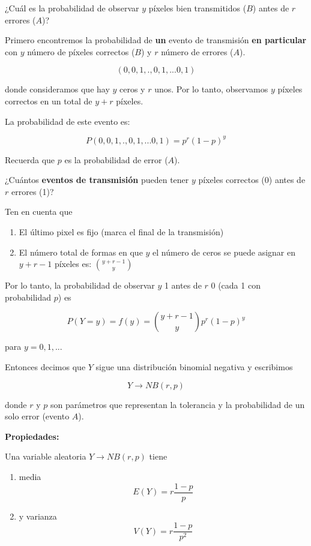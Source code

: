 \documentclass[
]{book}
\begin{document}
¿Cuál es la probabilidad de observar \(y\) píxeles bien transmitidos (\(B\)) antes de \(r\) errores (\(A\))?

Primero encontremos la probabilidad de \textbf{un} evento de transmisión \textbf{en particular} con \(y\) número de píxeles correctos (\(B\)) y \(r\) número de errores (\(A\)).

\[(0,0,1,., 0,1,...0,1)\]

donde consideramos que hay \(y\) ceros y \(r\) unos. Por lo tanto, observamos \(y\) píxeles correctos en un total de \(y + r\) píxeles.

La probabilidad de este evento es:

\[P(0,0,1,., 0,1,...0,1)=p^r(1-p)^y\]

Recuerda que \(p\) es la probabilidad de error (\(A\)).

¿Cuántos \textbf{eventos de transmisión} pueden tener \(y\) píxeles correctos (0) antes de \(r\) errores (1)?

Ten en cuenta que

\begin{enumerate}
\def\labelenumi{\arabic{enumi})}
\item
  El último pixel es fijo (marca el final de la transmisión)
\item
  El número total de formas en que \(y\) el número de ceros se puede asignar en \(y + r-1\) píxeles es: \(\binom {y + r-1} y\)
\end{enumerate}

Por lo tanto, la probabilidad de observar \(y\) 1 antes de \(r\) 0 (cada 1 con probabilidad \(p\)) es

\[P(Y=y)=f(y)=\binom {y+r-1} yp^r(1-p)^y\]

para \(y=0,1,...\)

Entonces decimos que \(Y\) sigue una distribución binomial negativa y escribimos

\[Y\rightarrow NB(r,p)\]

donde \(r\) y \(p\) son parámetros que representan la tolerancia y la probabilidad de un solo error (evento \(A\)).

\textbf{Propiedades:}

Una variable aleatoria \(Y\rightarrow NB(r,p)\) tiene

\begin{enumerate}
\def\labelenumi{\arabic{enumi})}
\item
  media \[E(Y)= r\frac{1-p}{p}\]
\item
  y varianza \[V(Y)= r\frac{1-p}{p^2}\]
\end{enumerate}
\end{document}
